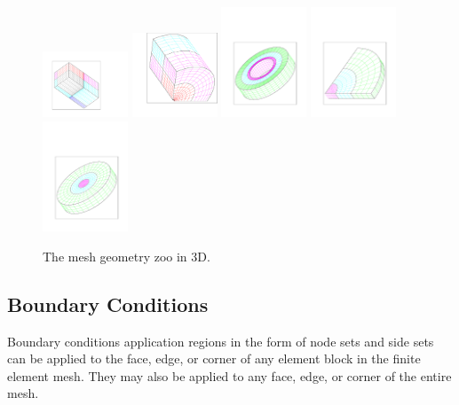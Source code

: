 \begin{figure}[h]
    \centering
      \includegraphics[width=1.0in]{brick}
      \includegraphics[width=1.0in]{cubit_radial1}
      \includegraphics[width=1.0in]{cubit_radial2}
      \includegraphics[width=1.0in]{cubit_radial_trisection}
      \includegraphics[width=1.0in]{cubit_radial_trisection2}
  \caption{The mesh geometry zoo in 3D.}
  \label{fig:btm}
\end{figure}

\subsection{Boundary Conditions}
Boundary conditions application regions in the form of node sets and side sets can be applied to the face, edge, or corner of any element block in the finite element mesh. They may also be applied to any face, edge, or corner of the entire mesh.
